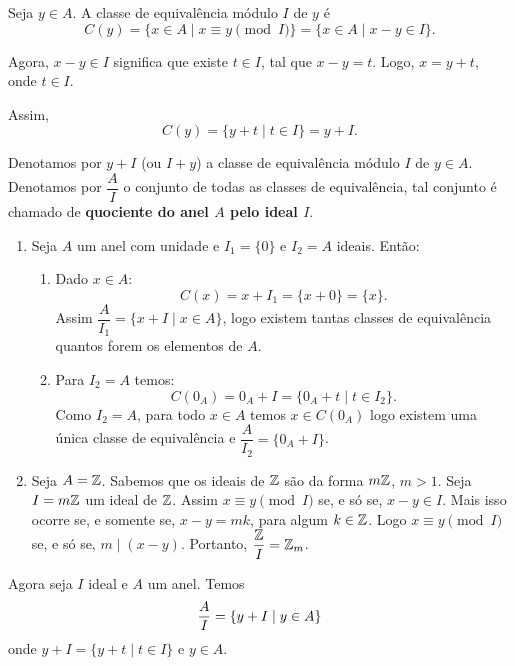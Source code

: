 Seja $y \in A$. A classe de equival{\^e}ncia m{\'o}dulo $I$ de $y$ {\'e}
\[
	C(y) = \{x \in A \mid x\equiv y \pmod I\} = \{x \in A \mid x - y \in I\}.
\]

Agora, $x - y \in I$ significa que existe $t \in I$, tal que $x - y = t$. Logo, $x = y + t$, onde $t \in I$.

Assim,
\[
	C(y) = \{y + t\mid t \in I\} = y + I.
\]

\begin{observacao}
	Denotamos por $y + I$ (ou $I + y$) a classe de equival{\^e}ncia m{\'o}dulo $I$ de $y \in A$. Denotamos por $\dfrac{A}{I}$ o conjunto de todas as classes de equival{\^e}ncia, tal conjunto {\'e} chamado de \textbf{quociente do anel $A$ pelo ideal $I$}.
\end{observacao}

\begin{exemplos}
	\begin{enumerate}[label={\arabic*})]
		\item Seja $A$ um anel com unidade e $I_{1} = \{0\}$ e $I_{2} = A$ ideais. Ent\~ao:
		\begin{enumerate}[label={\roman*})]
		\item Dado $x \in A$:
		\[
			C(x) = x + I_{1} = \{x + 0\} = \{x\}.
		\]
		Assim $\dfrac{A}{I_{1}} = \{x + I \mid x \in A\}$, logo existem tantas classes de equival{\^e}ncia quantos forem os elementos de $A$.

		\item Para $I_{2} = A$ temos:
		\[
			C(0_A) = 0_A + I = \{0_A + t \mid t \in I_{2}\}.
		\]
		Como $I_2 = A$, para todo $x \in A$ temos $x \in C(0_A)$ logo existem uma \'unica classe de equival\^encia
		e $\dfrac{A}{I_{2}} = \{0_{A} + I\}$.
	\end{enumerate}

	\item Seja $A = \mathbb{Z}$. Sabemos que os ideais de $\mathbb{Z}$ s{\~a}o da forma $m\mathbb{Z}$, $m > 1$. Seja $I = m\mathbb{Z}$ um ideal de $\mathbb{Z}$. Assim $x\equiv y \pmod I$ se, e s\'o se, $x - y \in I$. Mais isso ocorre se, e somente se, $x - y = mk $, para algum $k \in \mathbb{Z}$. Logo $x\equiv y \pmod I$ se, e s\'o se, $m\mid (x - y)$. Portanto, $\dfrac{\mathbb{Z}}{I} = \mathbb{Z}_m$.
	\end{enumerate}
\end{exemplos}


Agora seja $I$ ideal e $A$ um anel. Temos
\[
	\dfrac{A}{I} = \{y + I \mid y \in A\}\\
\]
onde $y + I = \{y + t \mid t \in I\}$ e $y \in A$.

